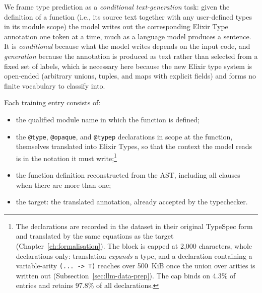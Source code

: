 We frame type prediction as a \emph{conditional text-generation} task: given the definition of a function (i.e., its source text together with any user-defined types in its module scope) the model writes out the corresponding Elixir Type annotation one token at a time, much as a language model produces a sentence.
It is \emph{conditional} because what the model writes depends on the input code, and \emph{generation} because the annotation is produced as text rather than selected from a fixed set of labels, which is necessary here because the new Elixir type system is open-ended (arbitrary unions, tuples, and maps with explicit fields) and forms no finite vocabulary to classify into.

Each training entry consists of:
\begin{itemize}
    \item the qualified module name in which the function is defined;
    \item the \texttt{@type}, \texttt{@opaque}, and \texttt{@typep} declarations in scope at the function, themselves translated into Elixir Types, so that the context the model reads is in the notation it must write;\footnote{The declarations are recorded in the dataset in their original TypeSpec form and translated by the same equations as the target (Chapter~\ref{ch:formalisation}). The block is capped at 2{,}000 characters, whole declarations only: translation \emph{expands} a type, and a declaration containing a variable-arity \texttt{(... -> T)} reaches over 500~KiB once the union over arities is written out (Subsection~\ref{sec:llm-data-prep}). The cap binds on \num{4.3}\% of entries and retains \num{97.8}\% of all declarations.}
    \item the function definition reconstructed from the AST, including all clauses when there are more than one;
    \item the target: the translated annotation, already accepted by the typechecker.
\end{itemize}

